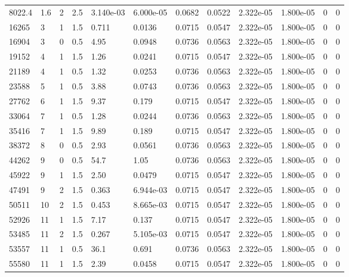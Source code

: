 \documentclass[preview]{standalone}
\begin{document}
{{\begin{tabular}{L{1.2cm}C{1.2cm} C{0.3cm}C{0.5cm} C{1.4cm}C{1.4cm} C{1.4cm}C{1.4cm} C{1.6cm}C{1.6cm} C{1.6cm}C{1.6cm}}
  8022.4  &   1.6  & 2     & 2.5 &  3.140e-03  & 6.000e-05  &  0.0682&   0.0522& 2.322e-05 & 1.800e-05   &  0 & 0  \\ 
  16265  &     3  & 1     & 1.5 &  0.711  & 0.0136  &  0.0715&   0.0547& 2.322e-05 & 1.800e-05   &  0 & 0  \\ 
  16904  &     3  & 0     & 0.5 &  4.95  & 0.0948  &  0.0736&   0.0563& 2.322e-05 & 1.800e-05   &  0 & 0  \\ 
  19152  &     4  & 1     & 1.5 &  1.26  & 0.0241  &  0.0715&   0.0547& 2.322e-05 & 1.800e-05   &  0 & 0  \\ 
  21189  &     4  & 1     & 0.5 &  1.32  & 0.0253  &  0.0736&   0.0563& 2.322e-05 & 1.800e-05   &  0 & 0  \\ 
  23588  &     5  & 1     & 0.5 &  3.88  & 0.0743  &  0.0736&   0.0563& 2.322e-05 & 1.800e-05   &  0 & 0  \\ 
  27762  &     6  & 1     & 1.5 &  9.37  & 0.179  &  0.0715&   0.0547& 2.322e-05 & 1.800e-05   &  0 & 0  \\ 
  33064  &     7  & 1     & 0.5 &  1.28  & 0.0244  &  0.0736&   0.0563& 2.322e-05 & 1.800e-05   &  0 & 0  \\ 
  35416  &     7  & 1     & 1.5 &  9.89  & 0.189  &  0.0715&   0.0547& 2.322e-05 & 1.800e-05   &  0 & 0  \\ 
  38372  &     8  & 0     & 0.5 &  2.93  & 0.0561  &  0.0736&   0.0563& 2.322e-05 & 1.800e-05   &  0 & 0  \\ 
  44262  &     9  & 0     & 0.5 &  54.7  & 1.05  &  0.0736&   0.0563& 2.322e-05 & 1.800e-05   &  0 & 0  \\ 
  45922  &     9  & 1     & 1.5 &  2.50  & 0.0479  &  0.0715&   0.0547& 2.322e-05 & 1.800e-05   &  0 & 0  \\ 
  47491  &     9  & 2     & 1.5 &  0.363  & 6.944e-03  &  0.0715&   0.0547& 2.322e-05 & 1.800e-05   &  0 & 0  \\ 
  50511  &    10  & 2     & 1.5 &  0.453  & 8.665e-03  &  0.0715&   0.0547& 2.322e-05 & 1.800e-05   &  0 & 0  \\ 
  52926  &    11  & 1     & 1.5 &  7.17  & 0.137  &  0.0715&   0.0547& 2.322e-05 & 1.800e-05   &  0 & 0  \\ 
  53485  &    11  & 2     & 1.5 &  0.267  & 5.105e-03  &  0.0715&   0.0547& 2.322e-05 & 1.800e-05   &  0 & 0  \\ 
  53557  &    11  & 1     & 0.5 &  36.1  & 0.691  &  0.0736&   0.0563& 2.322e-05 & 1.800e-05   &  0 & 0  \\ 
  55580  &    11  & 1     & 1.5 &  2.39  & 0.0458  &  0.0715&   0.0547& 2.322e-05 & 1.800e-05   &  0 & 0  \\ 

\end{tabular}}}
\end{document}

